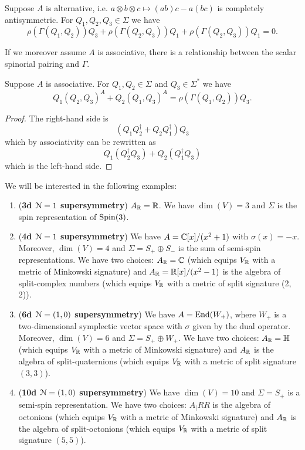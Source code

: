 \documentclass[10pt, oneside]{article}
\begin{document}
\begin{thm}
Suppose $A$ is alternative, i.e. $a\otimes b\otimes c\mapsto (ab)c - a(bc)$ is completely antisymmetric. For $Q_1, Q_2, Q_3\in\Sigma$ we have
\[\rho(\Gamma(Q_1, Q_2))Q_3 + \rho(\Gamma(Q_2, Q_3))Q_1 + \rho(\Gamma(Q_2, Q_3))Q_1 = 0.\]
\label{thm:3psi}
\end{thm}

If we moreover assume $A$ is associative, there is a relationship between the scalar spinorial pairing and $\Gamma$.

\begin{thm}
Suppose $A$ is associative. For $Q_1, Q_2\in\Sigma$ and $Q_3\in\Sigma^*$ we have
\[Q_1(Q_2, Q_3)^A + Q_2(Q_1, Q_3)^A = \rho(\Gamma(Q_1, Q_2)) Q_3.\]
\label{thm:matter3psi}
\end{thm}
\begin{proof}
The right-hand side is
\[(Q_1Q_2^\dagger + Q_2Q_1^\dagger)Q_3\]
which by associativity can be rewritten as
\[Q_1(Q_2^\dagger Q_3) + Q_2(Q_1^\dagger Q_3)\]
which is the left-hand side.
\end{proof}

We will be interested in the following examples:
\begin{enumerate}
\item (\textbf{3d $\mathcal{N}=1$ supersymmetry}) $A_\mathbb R = \mathbb R$. We have $\dim(V) = 3$ and $\Sigma$ is the spin representation of $\mathrm{Spin}(3)$.

\item (\textbf{4d $\mathcal{N}=1$ supersymmetry}) We have $A = \mathbb C[x]/(x^2+1)$ with $\sigma(x) = -x$. Moreover, $\dim(V) = 4$ and $\Sigma=S_+\oplus S_-$ is the sum of semi-spin representations. We have two choices: $A_\mathbb R=\mathbb C$ (which equips $V_\mathbb R$ with a metric of Minkowski signature) and $A_\mathbb R=\mathbb R[x]/(x^2-1)$ is the algebra of split-complex numbers (which equips $V_\mathbb R$ with a metric of split signature (2, 2)).

\item (\textbf{6d $\mathcal{N}=(1, 0)$ supersymmetry}) We have $A=\operatorname{End}(W_+)$, where $W_+$ is a two-dimensional symplectic vector space with $\sigma$ given by the dual operator. Moreover, $\dim(V) = 6$ and $\Sigma = S_+\oplus W_+$. We have two choices: $A_\mathbb R = \mathbb{H}$ (which equips $V_\mathbb R$ with a metric of Minkowski signature) and $A_\mathbb R$ is the algebra of split-quaternions (which equips $V_\mathbb R$ with a metric of split signature $(3, 3)$).

\item (\textbf{10d $\mathcal{N}=(1, 0)$ supersymmetry}) We have $\dim(V) = 10$ and $\Sigma = S_+$ is a semi-spin representation. We have two choices: $A_|RR$ is the algebra of octonions (which equips $V_\mathbb R$ with a metric of Minkowski signature) and $A_\mathbb R$ is the algebra of split-octonions (which equips $V_\mathbb R$ with a metric of split signature $(5, 5)$).
\end{enumerate}
\end{document}
